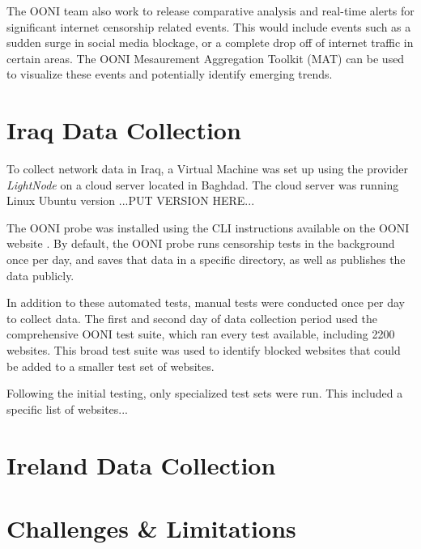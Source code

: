 The OONI team also work to release comparative analysis and real-time alerts for significant internet censorship related events. This would include events such as a sudden surge in social media blockage, or a complete drop off of internet traffic in certain areas. The OONI Mesaurement Aggregation Toolkit (MAT) can be used to visualize these events and potentially identify emerging trends. 

\section{Iraq Data Collection}

To collect network data in Iraq, a Virtual Machine was set up using the provider \textit{LightNode} \cite{lightnodeLightNodeGlobal} on a cloud server located in Baghdad. The cloud server was running Linux Ubuntu version ...PUT VERSION HERE...

The OONI probe was installed using the CLI instructions available on the OONI website \cite{OONISCLI}. By default, the OONI probe runs censorship tests in the background once per day, and saves that data in a specific directory, as well as publishes the data publicly. 

In addition to these automated tests, manual tests were conducted once per day to collect data. The first and second day of data collection period used the comprehensive OONI test suite, which ran every test available, including 2200 websites. This broad test suite was used to identify blocked websites that could be added to a smaller test set of websites.

Following the initial testing, only specialized test sets were run. This included a specific list of websites...

\section{Ireland Data Collection}

\section{Challenges \& Limitations}


